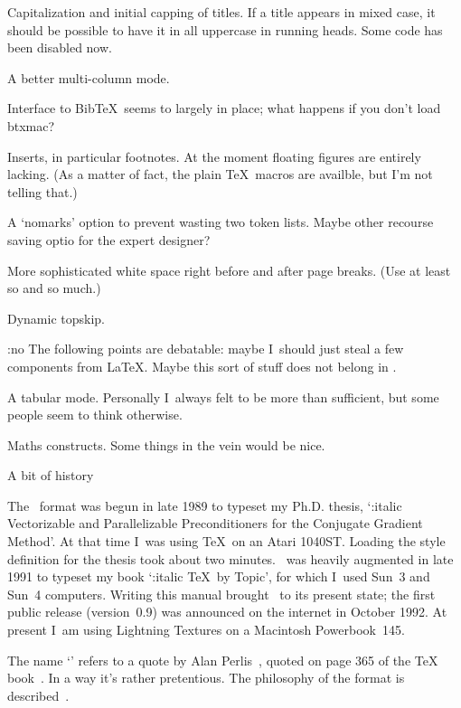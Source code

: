 \item Capitalization and initial capping of titles. If a
title appears in mixed case, it should be possible to have it in all
uppercase in running heads. Some code has been disabled now.

\item A better multi-column mode.

\item Interface to Bib\TeX\ seems to largely in place; what happens
if you don't load btxmac?

\item Inserts, in particular footnotes. At the moment floating
figures are entirely lacking. (As a matter of fact, the plain \TeX\
macros are availble, but I'm not telling that.)

\item A `nomarks' option to prevent wasting two token lists.
Maybe other recourse saving optio for the expert designer?

\item More sophisticated white space right before and after
page breaks. (Use at least so and so much.)

\item Dynamic topskip.

{\PopIndentLevel\Indent:no The following points are debatable:
maybe I~should just steal a few components from \LaTeX. Maybe this
sort of stuff does not belong in \Lollipop.\par}

\item A tabular mode. Personally I~always felt  to be more
than sufficient, but some people seem to think otherwise.

\item Maths constructs. Some things in the  vein would be
nice.

\>

\SubSection A bit of history

The \Lollipop\ format was begun in late 1989 to typeset my Ph.D.
thesis, `{\Style:italic Vectorizable and Parallelizable
Preconditioners for the Conjugate Gradient Method}'. At that time 
I~was using \TeX\ on an Atari 1040ST.
Loading the style definition for the thesis took about two minutes.
\Lollipop\ was heavily augmented in late 1991 to typeset my book
`{\Style:italic \TeX\ by Topic}', for which I~used Sun~3 and Sun~4
computers. Writing this manual brought \Lollipop\ to its present
state; the first public release (version~0.9) was announced on the
internet in October 1992. At present I~am using Lightning Textures on a
Macintosh Powerbook~145.

The name `' refers to a quote by Alan
Perlis~\bibref[Pe:epigrams], quoted on page 365 of the \TeX
book~\bibref[Kn:book]. In a way it's rather pretentious. The philosophy
of the \cs{Lollipop} format is described~\bibref[EL:Cork,E:Portland].

\endinput

92/10/22 historical remark about name added
92/11/03 section 'Lollipop and plain TeX' added;
         remarks about IniTeX in Textures
92/11/26 uses bibrefs
